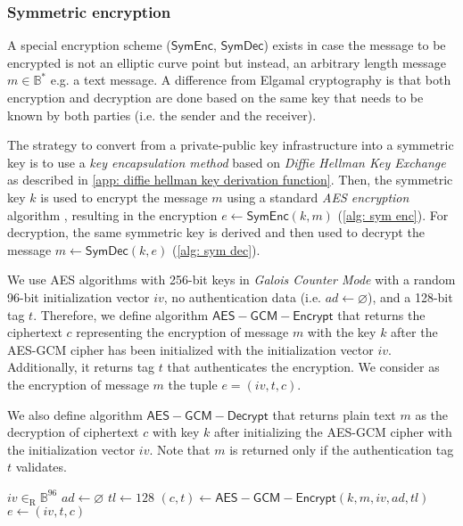 \subsubsection{Symmetric encryption} \label{app: symmetric encryption}
A special encryption scheme ($\mathsf{SymEnc}$, $\mathsf{SymDec}$) exists in case the message to be encrypted is not an elliptic curve point but instead, an arbitrary length message $m \in \mathbb{B}^*$ e.g. a text message. A difference from Elgamal cryptography is that both encryption and decryption are done based on the same key that needs to be known by both parties (i.e. the sender and the receiver). 

The strategy to convert from a private-public key infrastructure into a symmetric key is to use a \textit{key encapsulation method} based on \textit{Diffie Hellman Key Exchange} as described in \cref{app: diffie hellman key derivation function}. Then, the symmetric key $k$ is used to encrypt the message $m$ using a standard \textit{AES encryption} algorithm \cite{NIST01}, resulting in the encryption $e \gets \mathsf{SymEnc} (k, m)$ (\cref{alg: sym enc}). For decryption, the same symmetric key is derived and then used to decrypt the message $m \gets \mathsf{SymDec} (k, e)$ (\cref{alg: sym dec}).

We use AES algorithms with 256-bit keys in \textit{Galois Counter Mode} with a random 96-bit initialization vector $iv$, no authentication data (i.e. $ad \gets \varnothing$), and a 128-bit tag $t$. Therefore, we define algorithm $\mathsf{AES-GCM-Encrypt}$ that returns the ciphertext $c$ representing the encryption of message $m$ with the key $k$ after the AES-GCM cipher has been initialized with the initialization vector $iv$. Additionally, it returns tag $t$ that authenticates the encryption. We consider as the encryption of message $m$ the tuple $e = (iv, t, c)$.

We also define algorithm $\mathsf{AES-GCM-Decrypt}$ that returns plain text $m$ as the decryption of ciphertext $c$ with key $k$ after initializing the AES-GCM cipher with the initialization vector $iv$. Note that $m$ is returned only if the authentication tag $t$ validates.

\begin{algorithm}[ht]
    \DontPrintSemicolon
    \caption{$\mathsf{SymEnc} (k, m)$}
    \label{alg: sym enc}
    
    $iv \in_\mathrm{R} \mathbb{B}^{96}$ \;
    $ad \gets \varnothing$ \;
    $tl \gets 128$ \;
    $(c, t) \gets \mathsf{AES-GCM-Encrypt} (k, m, iv, ad, tl)$ \;
    $e \gets (iv, t, c)$ \;
     
\end{algorithm}


